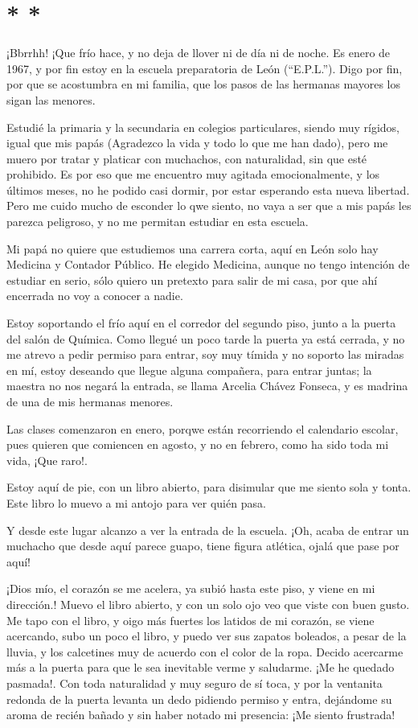 \documentclass[letterpaper, 12pt]{book}
\begin{document}
\section*{\centering * * *}
¡Bbrrhh! ¡Que frío hace, y no deja de llover ni de día ni de noche. Es enero de 1967, y por fin estoy en la escuela preparatoria de León (``E.P.L.''). Digo por fin, por que se acostumbra en mi familia, que los pasos de las hermanas mayores los sigan las menores.

Estudié la primaria y la secundaria en colegios particulares, siendo muy rígidos, igual que mis papás (Agradezco la vida y todo lo que me han dado), pero me muero por tratar y platicar con muchachos, con naturalidad, sin que esté prohibido. Es por eso que me encuentro muy agitada emocionalmente, y los últimos meses, no he podido casi dormir, por estar esperando esta nueva libertad. Pero me cuido mucho de esconder lo qwe siento, no vaya a ser que a mis papás les parezca peligroso, y no me permitan estudiar en esta escuela.

Mi papá no quiere que estudiemos una carrera corta, aquí en León solo hay Medicina y Contador Público. He elegido Medicina, aunque no tengo intención de estudiar en serio, sólo quiero un pretexto para salir de mi casa, por que ahí encerrada no voy a conocer a nadie.

Estoy soportando el frío aquí en el corredor del segundo piso, junto a la puerta del salón de Química. Como llegué un poco tarde la puerta ya está cerrada, y no me atrevo a pedir permiso para entrar, soy muy tímida y no soporto las miradas en mí, estoy deseando que llegue alguna compañera, para entrar juntas; la maestra no nos negará la entrada, se llama Arcelia Chávez Fonseca, y es madrina de una de mis hermanas menores.

Las clases comenzaron en enero, porqwe están recorriendo el calendario escolar, pues quieren que comiencen en agosto, y no en febrero, como ha sido toda mi vida, ¡Que raro!.

Estoy aquí de pie, con un libro abierto, para disimular que me siento sola y tonta. Este libro lo muevo a mi antojo para ver quién pasa.
 
Y desde este lugar alcanzo a ver la entrada de la escuela. ¡Oh, acaba de entrar un muchacho que desde aquí parece guapo, tiene figura atlética, ojalá que pase por aquí!

¡Dios mío, el corazón se me acelera, ya subió hasta este piso, y viene en mi dirección.! Muevo el libro abierto, y con un solo ojo veo que viste con buen gusto. Me tapo con el libro, y oigo más fuertes los latidos de mi corazón, se viene acercando, subo un poco el libro, y puedo ver sus zapatos boleados, a pesar de la lluvia, y los calcetines muy de acuerdo con el color de la ropa. Decido acercarme más a la puerta para que le sea inevitable verme y saludarme. ¡Me he quedado pasmada!. Con toda naturalidad y muy seguro de sí toca, y por la ventanita redonda de la puerta levanta un dedo pidiendo permiso y entra, dejándome su aroma de recién bañado y sin haber notado mi presencia: ¡Me siento frustrada!
\end{document}
